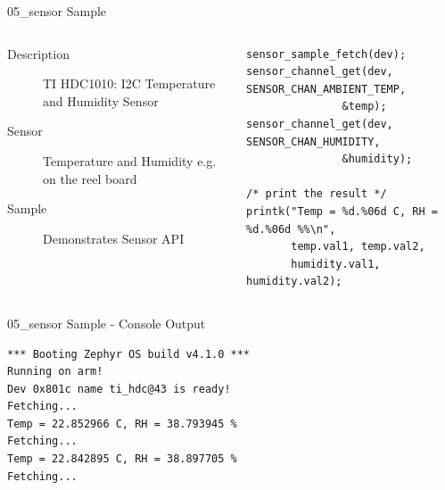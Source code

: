 \documentclass[10pt, aspectratio=169]{beamer}
\begin{document}
\begin{frame}[fragile]{05\_sensor Sample}
  \begin{columns}
    \begin{column}{0.6\textwidth}
      \begin{description}
	\item [Description] TI HDC1010: I2C Temperature and Humidity Sensor \footnotemark
	\item [Sensor] Temperature and Humidity e.g. on the reel board
	\item [Sample] Demonstrates Sensor API
      \end{description}
    \end{column}
    \begin{column}{0.4\textwidth}
        {\fontsize{5}{5}\selectfont
  \begin{listing}[H]
    \begin{verbatim}
sensor_sample_fetch(dev);
sensor_channel_get(dev, SENSOR_CHAN_AMBIENT_TEMP,
	           &temp);
sensor_channel_get(dev, SENSOR_CHAN_HUMIDITY,
	           &humidity);

/* print the result */
printk("Temp = %d.%06d C, RH = %d.%06d %%\n",
       temp.val1, temp.val2,
       humidity.val1, humidity.val2);
    \end{verbatim}
    \caption{\scriptsize{Excerpt from samples/05\_sensor/src/main.c}}
  \end{listing}
        }
    \end{column}
  \end{columns}
\end{frame}
\begin{frame}[fragile]{05\_sensor Sample - Console Output}
  \begin{listing}[H]
    \begin{verbatim}
*** Booting Zephyr OS build v4.1.0 ***
Running on arm!
Dev 0x801c name ti_hdc@43 is ready!
Fetching...
Temp = 22.852966 C, RH = 38.793945 %
Fetching...
Temp = 22.842895 C, RH = 38.897705 %
Fetching...
    \end{verbatim}
  \end{listing}
\end{frame}
\end{document}
